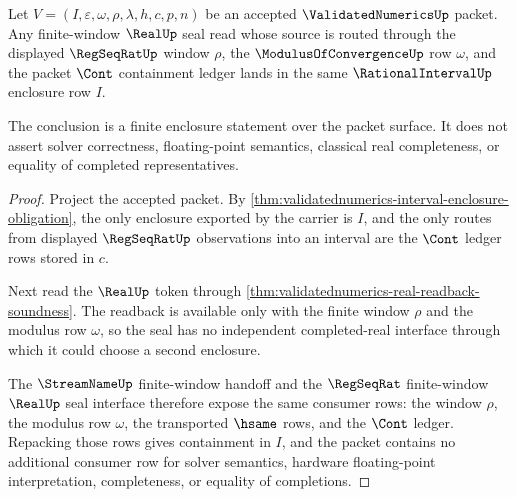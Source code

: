 \begin{theorem}
\label{thm:validatednumerics-finite-window-real-seal-containment}
Let $V=(I,\varepsilon,\omega,\rho,\lambda,h,c,p,n)$ be an accepted
$\ValidatedNumericsUp$ packet. Any finite-window $\RealUp$ seal read whose
source is routed through the displayed $\RegSeqRatUp$ window $\rho$, the
$\ModulusOfConvergenceUp$ row $\omega$, and the packet $\Cont$ containment
ledger lands in the same $\RationalIntervalUp$ enclosure row $I$.

The conclusion is a finite enclosure statement over the packet surface. It
does not assert solver correctness, floating-point semantics, classical real
completeness, or equality of completed representatives.
\end{theorem}
\begin{proof}
Project the accepted packet. By
\autoref{thm:validatednumerics-interval-enclosure-obligation}, the only
enclosure exported by the carrier is $I$, and the only routes from displayed
$\RegSeqRatUp$ observations into an interval are the $\Cont$ ledger rows
stored in $c$.

Next read the $\RealUp$ token through
\autoref{thm:validatednumerics-real-readback-soundness}. The readback is
available only with the finite window $\rho$ and the modulus row $\omega$,
so the seal has no independent completed-real interface through which it
could choose a second enclosure.

The $\StreamNameUp$ finite-window handoff and the $\RegSeqRat$ finite-window
$\RealUp$ seal interface therefore expose the same consumer rows: the window
$\rho$, the modulus row $\omega$, the transported $\hsame$ rows, and the
$\Cont$ ledger. Repacking those rows gives containment in $I$, and the
packet contains no additional consumer row for solver semantics, hardware
floating-point interpretation, completeness, or equality of completions.
\end{proof}

